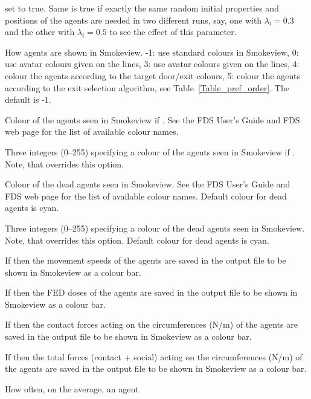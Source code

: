\documentclass[12pt,a4paper,final,twoside]{stylevk}
\begin{document}
\begin{description}
  set to true.  Same is true if exactly the same random initial
  properties and positions of the agents are needed in two different
  runs, say, one with $\lambda_i=0.3$ and the other with
  $\lambda_i=0.5$ to see the effect of this parameter.
%
\item[\Timts{COLOR\_METHOD}] How agents are shown in Smokeview. -1:
  use standard colours in Smokeview, 0: use avatar colours given on
  the  lines, 3: use avatar colours given on the
   lines, 4: colour the agents according to the target
  door/exit colours, 5: colour the agents according to the exit
  selection algorithm, see Table~\ref{Table_pref_order}.  The default
  is -1.
%
\item[\Timts{AVATAR\_COLOR}] Colour of the agents seen in Smokeview if
  .  See the FDS User's Guide and FDS web page
  for the list of available colour names.
%
\item[\Timts{AVATAR\_RGB}] Three integers (0--255) specifying a colour
  of the agents seen in Smokeview if .  Note,
  that  overrides this option.
%
\item[\Timts{DEAD\_COLOR}] Colour of the dead agents seen in Smokeview.
  See the FDS User's Guide and FDS web page for the list of available
  colour names.  Default colour for dead agents is cyan.
%
\item[\Timts{DEAD\_RGB}] Three integers (0--255) specifying a colour of
  the dead agents seen in Smokeview.  Note, that 
  overrides this option.  Default colour for dead agents is cyan.
%
\item[\Timts{OUTPUT\_SPEED}] If  then the movement
  speeds of the agents are saved in the output file to be shown in
  Smokeview as a colour bar.
%
\item[\Timts{OUTPUT\_FED}] If  then the FED doses of the
  agents are saved in the output file to be shown in Smokeview as a
  colour bar.
%
\item[\Timts{OUTPUT\_CONTACT\_FORCE}] If  then the
  contact forces acting on the circumferences (N/m) of the agents are
  saved in the output file to be shown in Smokeview as a colour bar.
%
\item[\Timts{OUTPUT\_TOTAL\_FORCE}] If  then the total
  forces (contact + social) acting on the circumferences (N/m) of the
  agents are saved in the output file to be shown in Smokeview as a
  colour bar.
%
\item[\Timts{TAU\_CHANGE\_V0}] How often, on the average, an agent

\end{description}
\end{document}
